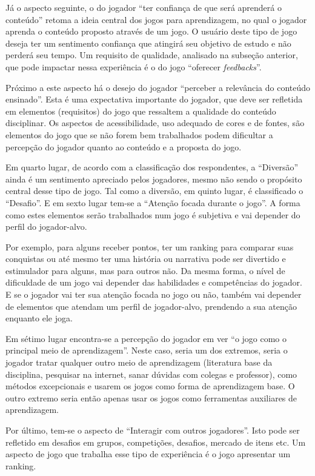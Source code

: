 Já o aspecto seguinte, o do jogador ``ter confiança de que será aprenderá o conteúdo'' retoma a ideia central dos jogos para aprendizagem, no qual o jogador aprenda o conteúdo proposto através de um jogo. O usuário deste tipo de jogo deseja ter um sentimento confiança que atingirá seu objetivo de estudo e não perderá seu tempo. Um requisito de qualidade, analisado na subseção anterior, que pode impactar nessa experiência é o do jogo ``oferecer \textit{feedbacks}''. 

Próximo a este aspecto há o desejo do jogador ``perceber a relevância do conteúdo ensinado''. Esta é uma expectativa importante do jogador, que deve ser refletida em elementos (requisitos) do jogo que ressaltem a qualidade do conteúdo disciplinar. Os aspectos de acessibilidade, uso adequado de cores e de fontes, são elementos do jogo que se não forem bem trabalhados podem dificultar a percepção do jogador quanto ao conteúdo e a proposta do jogo.

Em quarto lugar, de acordo com a classificação dos respondentes, a ``Diversão'' ainda é um sentimento apreciado pelos jogadores, mesmo não sendo o propósito central desse tipo de jogo. Tal como a diversão, em quinto lugar, é classificado o ``Desafio''. E em sexto lugar tem-se a ``Atenção focada durante o jogo''. A forma como estes elementos serão trabalhados num jogo é subjetiva e vai depender do perfil do jogador-alvo. 

Por exemplo, para alguns receber pontos, ter um ranking para comparar suas conquistas ou até mesmo ter uma história ou narrativa pode ser divertido e estimulador para alguns, mas para outros não. Da mesma forma, o nível de dificuldade de um jogo vai depender das habilidades e competências do jogador. E se o jogador vai ter sua atenção focada no jogo ou não, também vai depender de elementos que atendam um perfil de jogador-alvo, prendendo a sua atenção enquanto ele joga.

Em sétimo lugar encontra-se a percepção do jogador em ver ``o jogo como o principal meio de aprendizagem''. Neste caso, seria um dos extremos, seria o jogador tratar qualquer outro meio de aprendizagem (literatura base da disciplina, pesquisar na internet, sanar dúvidas com colegas e professor), como métodos excepcionais e usarem os jogos como forma de aprendizagem base. O outro extremo seria então apenas usar os jogos como ferramentas auxiliares de aprendizagem.

Por último, tem-se  o aspecto de ``Interagir com outros jogadores''. Isto pode ser refletido em desafios em grupos, competições, desafios, mercado de itens etc. Um aspecto de jogo que trabalha esse tipo de experiência é o jogo apresentar um ranking.

